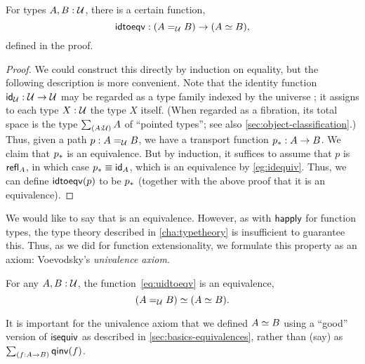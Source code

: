 \begin{lem}
  For types $A,B:\type$, there is a certain function,
  \begin{equation}\label{eq:uidtoeqv}
    \idtoeqv : (\id[\type]AB) \to (\eqv A B),
  \end{equation}
  defined in the proof.
\end{lem}
\begin{proof}
  We could construct this directly by induction on equality, but the following description is more convenient.
  Note that the identity function $\idfunc[\type]:\type\to\type$ may be regarded as a type family indexed by the universe \type; it assigns to each type $X:\type$ the type $X$ itself.
  (When regarded as a fibration, its total space is the type $\sm{A:\type}A$ of ``pointed types''; see also \autoref{sec:object-classification}.)
  Thus, given a path $p:A =_\type B$, we have a transport function $\transf{p}:A \to B$.
  We claim that $\transf{p}$ is an equivalence.
  But by induction, it suffices to assume that $p$ is $\refl A$, in which case $\transf{p} \jdeq \idfunc[A]$, which is an equivalence by \autoref{eg:idequiv}.
  Thus, we can define $\idtoeqv(p)$ to be $\transf{p}$ (together with the above proof that it is an equivalence).
\end{proof}

We would like to say that \idtoeqv is an equivalence.
However, as with $\happly$ for function types, the type theory described in \autoref{cha:typetheory} is insufficient to guarantee this.
Thus, as we did for function extensionality, we formulate this property as an axiom: Voevodsky's \emph{univalence axiom}.

\begin{axiom}[Univalence]\label{axiom:univalence}
  For any $A,B:\type$, the function~\eqref{eq:uidtoeqv} is an equivalence,
  \[
\eqv{(\id[\type]{A}{B})}{(\eqv A B)}.
\]
\end{axiom}

\begin{rmk}
  It is important for the univalence axiom that we defined $\eqv AB$ using a ``good'' version of $\isequiv$ as described in \autoref{sec:basics-equivalences}, rather than (say) as $\sm{f:A\to B} \qinv(f)$.
\end{rmk}

